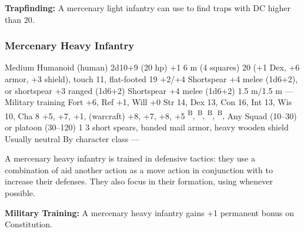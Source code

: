 \textbf{Trapfinding:} A mercenary light infantry can use  to find traps with DC higher than 20.

\subsubsection{Mercenary Heavy Infantry}
\begin{MonsterStats}
{Medium Humanoid (human)}
{2d10+9 (20 hp)}
{+1}
{6 m (4 squares)}
{20 (+1 Dex, +6 armor, +3 shield), touch 11, flat-footed 19}
{+2/+4}
{Shortspear +4 melee (1d6+2), or shortspear +3 ranged (1d6+2)}
{Shortspear +4 melee (1d6+2)}
{1.5 m/1.5 m}
{---}
{Military training}
{Fort +6, Ref +1, Will +0}
{Str 14, Dex 13, Con 16, Int 13, Wis 10, Cha 8}
{
     +5,
     +7,
     +1,
     (warcraft) +8,
     +7,
     +8,
     +5
}
{
    \textsuperscript{B},
    \textsuperscript{B},
    \textsuperscript{B},
    \textsuperscript{B},
}
{Any}
{Squad (10--30) or platoon (30--120)}
{1}
{
    3 short spears,
    banded mail armor,
    heavy wooden shield
}
{Usually neutral}
{By character class}
{---}
\end{MonsterStats}


A mercenary heavy infantry is trained in defensive tactics: they use a combination of aid another action as a move action in conjunction with  to increase their defenses. They also focus in their formation, using  whenever possible.

\textbf{Military Training:} A mercenary heavy infantry gains +1 permanent bonus on Constitution.



